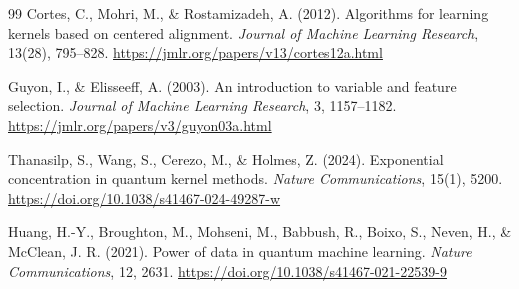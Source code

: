 \begin{thebibliography}{99}
    Cortes, C., Mohri, M., \& Rostamizadeh, A. (2012).
    Algorithms for learning kernels based on centered alignment.
    \textit{Journal of Machine Learning Research}, 13(28), 795--828.
    \url{https://jmlr.org/papers/v13/cortes12a.html}

    Guyon, I., \& Elisseeff, A. (2003).
    An introduction to variable and feature selection.
    \textit{Journal of Machine Learning Research}, 3, 1157--1182.
    \url{https://jmlr.org/papers/v3/guyon03a.html}

    Thanasilp, S., Wang, S., Cerezo, M., \& Holmes, Z. (2024).
    Exponential concentration in quantum kernel methods.
    \textit{Nature Communications}, 15(1), 5200.
    \url{https://doi.org/10.1038/s41467-024-49287-w}

    Huang, H.-Y., Broughton, M., Mohseni, M., Babbush, R., Boixo, S., Neven, H., \& McClean, J. R. (2021). Power of data in quantum machine learning.
    \textit{Nature Communications}, 12, 2631.
    \url{https://doi.org/10.1038/s41467-021-22539-9}

\end{thebibliography}
